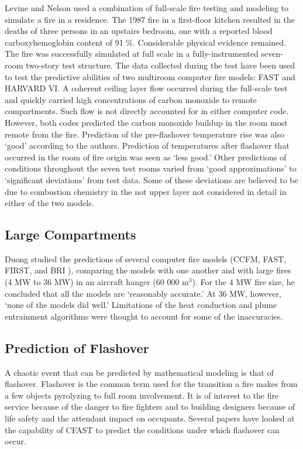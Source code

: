 Levine and Nelson \cite{Valid:Levine} used a combination of full-scale fire testing and modeling to simulate a fire in a residence. The 1987 fire in a first-floor kitchen resulted in the deaths of three persons in an upstairs bedroom, one with a reported blood carboxyhemoglobin content of 91 \%. Considerable physical evidence remained. The fire was successfully simulated at full scale in a fully-instrumented seven-room two-story test structure. The data collected during the test have been used to test the predictive abilities of two multiroom computer fire models: FAST and HARVARD VI. A coherent ceiling layer flow occurred during the full-scale test and quickly carried high concentrations of carbon monoxide to remote compartments. Such flow is not directly accounted for in either computer code. However, both codes predicted the carbon monoxide buildup in the room most remote from the fire. Prediction of the pre-flashover temperature rise was also `good' according to the authors. Prediction of temperatures after flashover that occurred in the room of fire origin was seen as `less good.' Other predictions of conditions throughout the seven test rooms varied from `good approximations' to `significant deviations' from test data. Some of these deviations are believed to be due to combustion chemistry in the not upper layer not considered in detail in either of the two models.

\subsection{Large Compartments}

Duong \cite{Valid:Duong} studied the predictions of several computer fire models (CCFM, FAST, FIRST, and BRI \cite{Models:BRI}), comparing the models with one another and with large fires (4 MW to 36 MW) in an aircraft hanger (60 000 m$^3$). For the 4 MW fire size, he concluded that all the models are `reasonably accurate.' At 36 MW, however, `none of the models did well.' Limitations of the heat conduction and plume entrainment algorithms were thought to account for some of the inaccuracies.

\subsection{Prediction of Flashover}

A chaotic event that can be predicted by mathematical modeling is that of flashover. Flashover is
the common term used for the transition a fire makes from a few objects pyrolyzing to full room
involvement. It is of interest to the fire service because of the danger to fire fighters and to
building designers because of life safety and the attendant impact on occupants. Several papers
have looked at the capability of CFAST to predict the conditions under which flashover can
occur.

